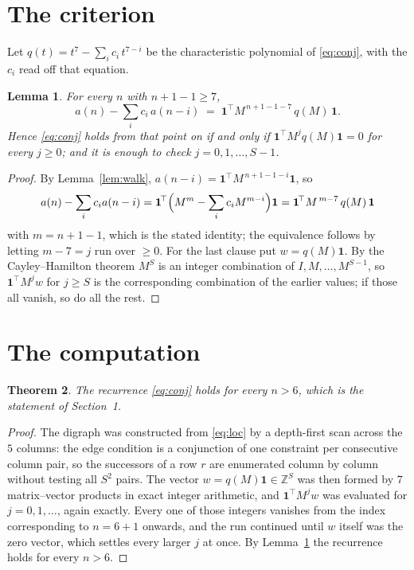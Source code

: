 \documentclass[11pt,a4paper]{article}
\theoremstyle{plain}
\newtheorem{theorem}{Theorem}
\newtheorem{lemma}[theorem]{Lemma}
\theoremstyle{definition}
\begin{document}
\section{The criterion}

Let $q(t)=t^{7}-\sum_i c_i\,t^{7-i}$ be the characteristic polynomial of
\eqref{eq:conj}, with the $c_i$ read off that equation.

\begin{lemma}\label{lem:crit}
For every $n$ with $n+1-1\ge7$,
\[
a(n)-\sum_i c_i\,a(n-i)\;=\;\mathbf{1}^{\!\top}M^{\,n+1-1-7}\,q(M)\,\mathbf{1} .
\]
Hence \eqref{eq:conj} holds from that point on if and only if
$\mathbf{1}^{\!\top}M^{j}q(M)\mathbf{1}=0$ for every $j\ge0$; and it is enough to check
$j=0,1,\dots,S-1$.
\end{lemma}

\begin{proof}
By Lemma~\ref{lem:walk}, $a(n-i)=\mathbf{1}^{\!\top}M^{\,n+1-1-i}\mathbf{1}$, so
\[
a(n)-\sum_i c_i a(n-i)
=\mathbf{1}^{\!\top}\Bigl(M^{m}-\sum_i c_i M^{m-i}\Bigr)\mathbf{1}
=\mathbf{1}^{\!\top}M^{\,m-7}\,q(M)\,\mathbf{1}
\]
with $m=n+1-1$, which is the stated identity; the equivalence follows by letting
$m-7=j$ run over $\ge0$. For the last clause put $w=q(M)\mathbf{1}$. By the
Cayley--Hamilton theorem $M^{S}$ is an integer combination of $I,M,\dots,M^{S-1}$, so
$\mathbf{1}^{\!\top}M^{j}w$ for $j\ge S$ is the corresponding combination of the earlier
values; if those all vanish, so do all the rest.
\end{proof}

\section{The computation}

\begin{theorem}
The recurrence \eqref{eq:conj} holds for every $n>6$, which is the statement of
Section~1.
\end{theorem}

\begin{proof}
The digraph was constructed from \eqref{eq:loc} by a depth-first scan across the $5$
columns: the edge condition is a conjunction of one constraint per consecutive column
pair, so the successors of a row $r$ are enumerated column by column without testing all
$S^2$ pairs. The vector $w=q(M)\mathbf{1}\in\mathbb{Z}^{S}$ was then formed by $7$
matrix--vector products in exact integer arithmetic, and $\mathbf{1}^{\!\top}M^{j}w$ was
evaluated for $j=0,1,\dots$, again exactly. Every one of those integers vanishes from the
index corresponding to $n=6+1$ onwards, and the run continued until $w$ itself was the
zero vector, which settles every larger $j$ at once. By Lemma~\ref{lem:crit} the recurrence
holds for every $n>6$.
\end{proof}
\end{document}
